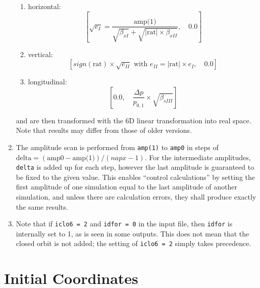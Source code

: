 \begin{enumerate}
        \begin{enumerate}
            \item horizontal:\\
            \begin{equation*}
                \left[\sqrt{e_I} = \frac{\mbox{amp(1)}} {\sqrt{\beta_{xI}}+\sqrt{\left|\mbox{rat}\right|\times\beta_{xII}}}, \quad 0.0 \right]
            \end{equation*}
            \item vertical:\\
            \begin{equation*}
                \left[sign(\mbox{rat})\times \sqrt{e_{II}} \mbox{ with } e_{II} = \left|\mbox{rat}\right|\times e_{I}, \quad 0.0 \right]
            \end{equation*}
            \item longitudinal:\\
            \begin{equation*}
                \left[0.0, \quad \frac{\Delta p}{p_{0,1}} \times \sqrt{\beta_{sIII}} \right]
            \end{equation*}
        \end{enumerate}
        and are then transformed with the 6D linear transformation into real space. Note that results may differ from those of older versions.
    \item The amplitude scan is performed from \texttt{amp(1)} to \texttt{amp0} in steps of $\mbox{delta} = (\mbox{amp0} - \mbox{amp(1)}) / (napx-1)$. For the intermediate amplitudes, \texttt{delta} is added up for each step, however the last amplitude is guaranteed to be fixed to the given value. This enables ``control calculations'' by setting the first amplitude of one simulation equal to the last amplitude of another simulation, and unless there are calculation errors, they shall produce exactly the same results.
    \item Note that if \texttt{iclo6 = 2} and \texttt{idfor = 0} in the input file, then \texttt{idfor} is internally set to 1, as is seen in some outputs. This does not mean that the closed orbit is not added; the setting of \texttt{iclo6 = 2} simply takes precedence.
\end{enumerate}

\section{Initial Coordinates} \label{IniCoo}

